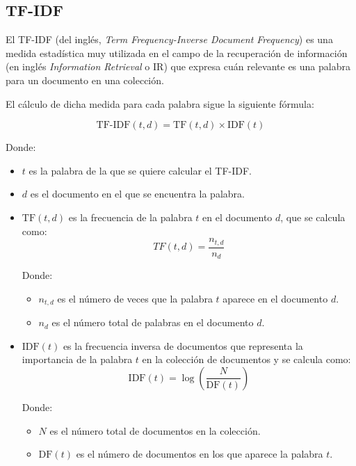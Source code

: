 \subsection{TF-IDF}
El TF-IDF (del inglés, \textit{Term Frequency-Inverse Document Frequency}) es una medida estadística muy utilizada en el campo de la recuperación de información
(en inglés \textit{Information Retrieval} o IR) que expresa cuán relevante es una palabra para un documento en una colección.

\bigskip
El cálculo de dicha medida para cada palabra sigue la siguiente fórmula:

\begin{equation}
	\label{eq:tfidf}
	\text{TF-IDF}(t,d) = \text{TF}(t,d) \times \text{IDF}(t)
\end{equation}

Donde:
\begin{itemize}
	\item $t$ es la palabra de la que se quiere calcular el TF-IDF.
	\item $d$ es el documento en el que se encuentra la palabra.
	\item $\text{TF}(t,d)$ es la frecuencia de la palabra $t$ en el documento $d$, que se calcula como:
	      \begin{equation}
		      \label{eq:tf}
		      TF(t,d) = \frac{n_{t,d}}{n_d}
	      \end{equation}

	      Donde:
	      \begin{itemize}
		      \item $n_{t,d}$ es el número de veces que la palabra $t$ aparece en el documento $d$.
		      \item $n_d$ es el número total de palabras en el documento $d$.
	      \end{itemize}

	\item $\text{IDF}(t)$ es la frecuencia inversa de documentos que representa la importancia de la palabra $t$ en la colección de documentos y
	      se calcula como:
	      \begin{equation}
		      \label{eq:idf}
		      \text{IDF}(t) = \log \left(\frac{N}{\text{DF}(t)}\right)
	      \end{equation}

	      Donde:
	      \begin{itemize}
		      \item $N$ es el número total de documentos en la colección.
		      \item $\text{DF}(t)$ es el número de documentos en los que aparece la palabra $t$.
	      \end{itemize}
\end{itemize}

